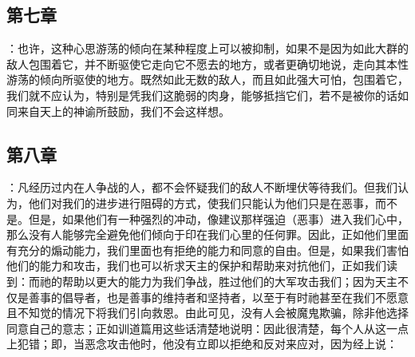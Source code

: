 
\subsection{第七章}

\par

：也许，这种心思游荡的倾向在某种程度上可以被抑制，如果不是因为如此大群的敌人包围着它，并不断驱使它走向它不愿去的地方，或者更确切地说，走向其本性游荡的倾向所驱使的地方。既然如此无数的敌人，而且如此强大可怕，包围着它，我们就不应认为，特别是凭我们这脆弱的肉身，能够抵挡它们，若不是被你的话如同来自天上的神谕所鼓励，我们不会这样想。\par


\subsection{第八章}

\par

：凡经历过内在人争战的人，都不会怀疑我们的敌人不断埋伏等待我们。但我们认为，他们对我们的进步进行阻碍的方式，使我们只能认为他们只是在恶事，而不是。但是，如果他们有一种强烈的冲动，像建议那样强迫（恶事）进入我们心中，那么没有人能够完全避免他们倾向于印在我们心里的任何罪。因此，正如他们里面有充分的煽动能力，我们里面也有拒绝的能力和同意的自由。但是，如果我们害怕他们的能力和攻击，我们也可以祈求天主的保护和帮助来对抗他们，正如我们读到：而祂的帮助以更大的能力为我们争战，胜过他们的大军攻击我们；因为天主不仅是善事的倡导者，也是善事的维持者和坚持者，以至于有时祂甚至在我们不愿意且不知觉的情况下将我们引向救恩。由此可见，没有人会被魔鬼欺骗，除非他选择同意自己的意志；正如训道篇用这些话清楚地说明：因此很清楚，每个人从这一点上犯错；即，当恶念攻击他时，他没有立即以拒绝和反对来应对，因为经上说：\par


